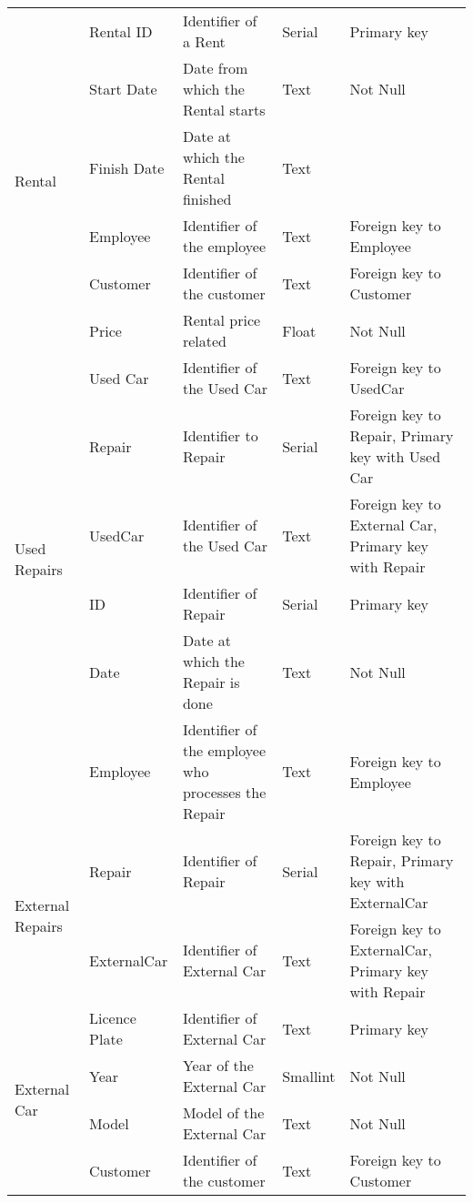 \begin{longtable}{|p{}|p{} |p{}|p{}|p{} |}
\multirow{6}{*}{Rental} 
    & Rental ID  & Identifier of a Rent & Serial & Primary key \\\cline{2-5}
    & Start Date & Date from which the Rental starts & Text & Not Null\\\cline{2-5}
    & Finish Date & Date at which the Rental finished & Text & \\\cline{2-5}
    & Employee & Identifier of the employee & Text & Foreign key to Employee\\\cline{2-5}
    & Customer & Identifier of the customer & Text & Foreign key to Customer\\\cline{2-5}
    & Price & Rental price related & Float & Not Null\\\cline{2-5}
    & Used Car & Identifier of the Used Car & Text & Foreign key to UsedCar\\\hline

\multirow{4}{*}{Used Repairs} 
    & Repair & Identifier to Repair & Serial & Foreign key to Repair, Primary key with Used Car\\\cline{2-5}
    & UsedCar & Identifier of the Used Car & Text & Foreign key to External Car, Primary key with Repair\\\hline

\multirow{3}{*}{Repair}  
    & ID & Identifier of Repair & Serial & Primary key \\\cline{2-5}
    & Date & Date at which the Repair is done & Text & Not Null \\\cline{2-5}
    & Employee & Identifier of the employee who processes the Repair &  Text & Foreign key to Employee\\\hline

\multirow{2}{*}{External Repairs} 
    & Repair & Identifier of Repair & Serial & Foreign key to Repair, Primary key with ExternalCar\\\cline{2-5}
    & ExternalCar & Identifier of External Car & Text & Foreign key to ExternalCar, Primary key with Repair\\\hline

\multirow{4}{*}{External Car} 
    & Licence Plate & Identifier of External Car & Text & Primary key\\\cline{2-5}
    & Year & Year of the External Car  & Smallint & Not Null \\\cline{2-5}
    & Model & Model of the External Car & Text & Not Null \\\cline{2-5}
    & Customer  & Identifier of the customer & Text & Foreign key to Customer\\\hline


\end{longtable}
